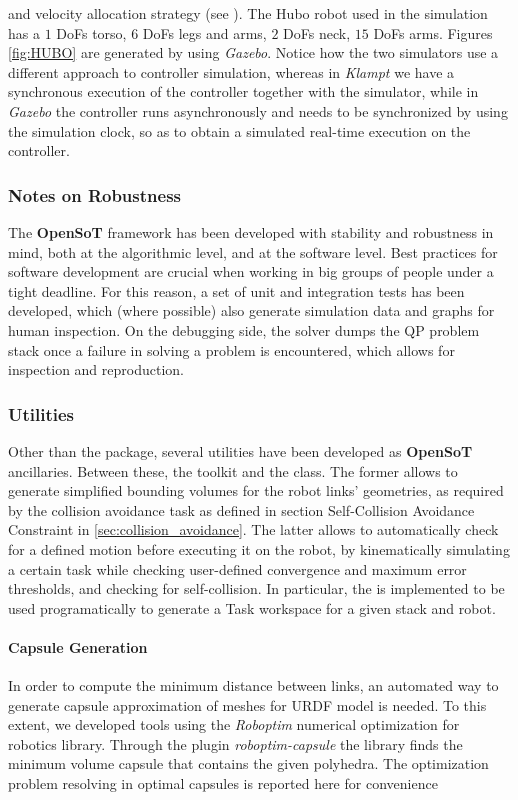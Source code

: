 and velocity allocation strategy (see ).
The Hubo robot used in the simulation has a $1$ DoFs torso, $6$ DoFs legs and arms, $2$ DoFs neck, $15$ DoFs arms. Figures \ref{fig:HUBO} are generated by using \emph{Gazebo}. Notice how the two simulators use a different approach to controller simulation, whereas in \emph{Klampt} we have a synchronous execution of the controller together with the simulator, while in \emph{Gazebo} the controller runs asynchronously and needs to be synchronized by using the simulation clock, so as to obtain a simulated real-time execution on the controller.

\subsubsection{Notes on Robustness}
The \textbf{OpenSoT} framework has been developed with stability and robustness in mind, both at the algorithmic level, and at the software level. Best practices for software development are crucial when working in big groups of people under a tight deadline. For this reason, a set of unit and integration tests has been developed, which (where possible) also generate simulation data and graphs for human inspection. On the debugging side, the solver dumps the QP problem stack once a failure in solving a problem is encountered, which allows for inspection and reproduction.

\subsubsection{Utilities}
Other than the  package, several utilities have been developed as \textbf{OpenSoT} ancillaries. Between these, the  toolkit and the  class. The former allows to generate simplified bounding volumes for the robot links' geometries, as required by the collision avoidance task as defined in section Self-Collision Avoidance Constraint in \ref{sec:collision_avoidance}.
The latter allows to automatically check for a defined motion before executing it on the robot, by kinematically simulating a certain task while checking user-defined convergence and maximum error thresholds, and checking for self-collision. In particular, the  is implemented to  be used programatically to generate a Task workspace for a given stack and robot.

\paragraph{Capsule Generation}
\label{subsub:CapsuleGeneration}
In order to compute the minimum distance between links, an automated way to generate capsule approximation of meshes for URDF model is needed. To this extent, we developed tools using the \emph{Roboptim} \cite{Moulard2013-nk,Moulard_undated-tm} numerical optimization for robotics library. Through the plugin \emph{roboptim-capsule} the library finds the minimum volume capsule that contains the given polyhedra. The optimization problem resolving in optimal capsules is reported here for convenience \cite{el_khoury2013-rp}

